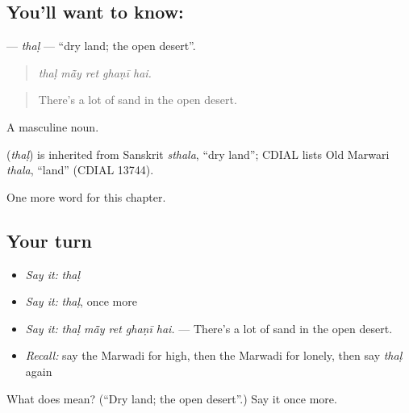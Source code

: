 \subsection*{You'll want to know: }
\textbf{} — \emph{thaḷ} — \textquotedblleft{}dry land; the open desert\textquotedblright{}.

\begin{quote}
    
\end{quote}

\begin{quote}
\emph{thaḷ mā̃y ret ghaṇī hai.}
\end{quote}

\begin{quote}
There's a lot of sand in the open desert.
\end{quote}

A masculine noun.

\begin{cousinweb}
\textbf{} (\emph{thaḷ}) is inherited from Sanskrit \emph{sthala}, \textquotedblleft{}dry land\textquotedblright{}; CDIAL lists Old Marwari \emph{thala}, \textquotedblleft{}land\textquotedblright{} (CDIAL 13744).
\end{cousinweb}

\begin{grammarlens}[title={What you've built}]
One more word for this chapter.
\end{grammarlens}

\subsection*{Your turn}
\begin{itemize}
\raggedright
  \item \emph{Say it:} \emph{thaḷ}
  \item \emph{Say it:} \emph{thaḷ}, once more
  \item \emph{Say it:} \emph{thaḷ mā̃y ret ghaṇī hai.} — There's a lot of sand in the open desert.
  \item \emph{Recall:} say the Marwadi for high, then the Marwadi for lonely, then say \emph{thaḷ} again
\end{itemize}

\begin{tcolorbox}[breakable,colback=teal!4,colframe=teal!35!black,title={Before you move on}]
What does  mean? (\textquotedblleft{}Dry land; the open desert\textquotedblright{}.) Say it once more.
\end{tcolorbox}
